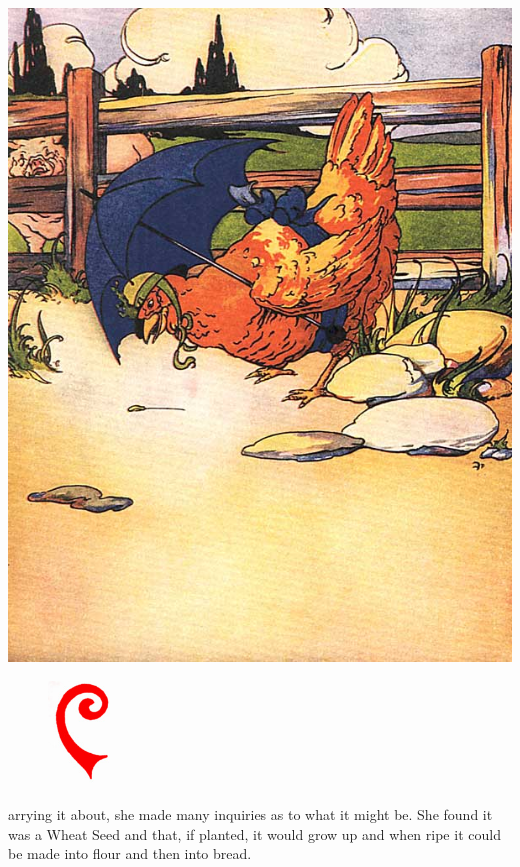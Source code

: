 \documentclass[letterpaper, 10pt, openany]{memoir}
\begin{document}
\newpage
\begin{center}
	\includegraphics[width=\textwidth]{image_046_1.jpg}
\end{center}

\newpage
\begin{figure}
	\includegraphics[width=0.15\textwidth]{image_011_1.jpg}
\end{figure}

arrying it about, she made many inquiries as to what it might be. She found it was a
Wheat Seed and that, if planted, it would grow up and when ripe it could be made into
flour and then into bread.
\end{document}
